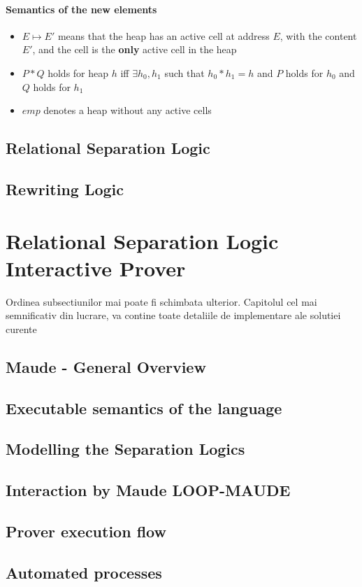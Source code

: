 \documentclass[12pt,a4paper]{article}
\begin{document}
\paragraph{Semantics of the new elements}
\begin{itemize}
	\item{\(E \mapsto E\prime \) means that the heap has an active cell at address \(E\), with the content \(E\prime\), and the cell is the \textbf{only} active cell in the heap}
	\item{\(P * Q\) holds for heap \(h\) iff \(\exists h_0,h_1\) such that \(h_0 * h_1 = h\) and \(P\) holds for \(h_0\) and \(Q\) holds for \(h_1\)}
	\item{\(emp\) denotes a heap without any active cells}
\end{itemize}
\subsection{Relational Separation Logic}
\subsection{Rewriting Logic}
\section{Relational Separation Logic Interactive Prover}
Ordinea subsectiunilor mai poate fi schimbata ulterior. Capitolul cel mai semnificativ din lucrare, va contine toate detaliile de implementare ale solutiei curente
\subsection{Maude - General Overview}
\subsection{Executable semantics of the language}
\subsection{Modelling the Separation Logics}
\subsection{Interaction by Maude LOOP-MAUDE}
\subsection{Prover execution flow}
\subsection{Automated processes}
\end{document}
